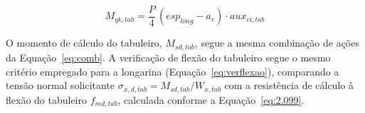 \begin{equation}
M_{qk,tab} = \frac{P}{4}\,\left(esp_{long} - a_r\right)\cdot aux_{ci,tab}
\label{eq:mqktab}
\end{equation}

O momento de cálculo do tabuleiro, $M_{sd,tab}$, segue a mesma combinação de ações da Equação~\eqref{eq:comb}.
A verificação de flexão do tabuleiro segue o mesmo critério empregado para a longarina (Equação~\eqref{eq:verflexao}), comparando a tensão normal solicitante $\sigma_{x,d,tab} = M_{sd,tab}/W_{x,tab}$ com a resistência de cálculo à flexão do tabuleiro $f_{md,tab}$, calculada conforme a Equação~\eqref{eq:2.099}.
